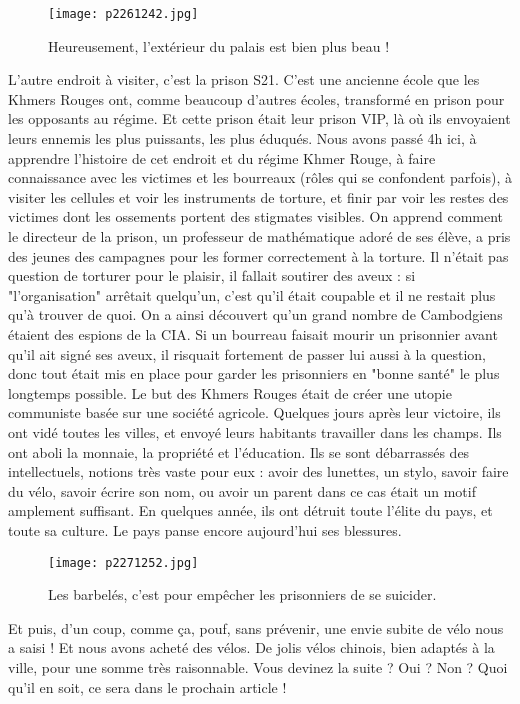 \documentclass{book}
\begin{document}
\begin{figure}[h]
\centering
\texttt{[image: p2261242.jpg]}
\caption*{Heureusement, l'extérieur du palais est bien plus beau !}
\end{figure}

L'autre endroit à visiter, c'est la prison S21. C'est une ancienne école que les Khmers Rouges ont, comme beaucoup d'autres écoles, transformé en prison pour les opposants au régime. Et cette prison était leur prison VIP, là où ils envoyaient leurs ennemis les plus puissants, les plus éduqués. Nous avons passé 4h ici, à apprendre l'histoire de cet endroit et du régime Khmer Rouge, à faire connaissance avec les victimes et les bourreaux (rôles qui se confondent parfois), à visiter les cellules et voir les instruments de torture, et finir par voir les restes des victimes dont les ossements portent des stigmates visibles. On apprend comment le directeur de la prison, un professeur de mathématique adoré de ses élève, a pris des jeunes des campagnes pour les former correctement à la torture. Il n'était pas question de torturer pour le plaisir, il fallait soutirer des aveux : si "l'organisation" arrêtait quelqu'un, c'est qu'il était coupable et il ne restait plus qu'à trouver de quoi. On a ainsi découvert qu'un grand nombre de Cambodgiens étaient des espions de la CIA. Si un bourreau faisait mourir un prisonnier avant qu'il ait signé ses aveux, il risquait fortement de passer lui aussi à la question, donc tout était mis en place pour garder les prisonniers en "bonne santé" le plus longtemps possible. Le but des Khmers Rouges était de créer une utopie communiste basée sur une société agricole. Quelques jours après leur victoire, ils ont vidé toutes les villes, et envoyé leurs habitants travailler dans les champs. Ils ont aboli la monnaie, la propriété et l'éducation. Ils se sont débarrassés des intellectuels, notions très vaste pour eux : avoir des lunettes, un stylo, savoir faire du vélo, savoir écrire son nom, ou avoir un parent dans ce cas était un motif amplement suffisant. En quelques année, ils ont détruit toute l'élite du pays, et toute sa culture. Le pays panse encore aujourd'hui ses blessures.


\begin{figure}[h]
\centering
\texttt{[image: p2271252.jpg]}
\caption*{Les barbelés, c'est pour empêcher les prisonniers de se suicider.}
\end{figure}

Et puis, d'un coup, comme ça, pouf, sans prévenir, une envie subite de vélo nous a saisi ! Et nous avons acheté des vélos. De jolis vélos chinois, bien adaptés à la ville, pour une somme très raisonnable. Vous devinez la suite ? Oui ? Non ? Quoi qu'il en soit, ce sera dans le prochain article !
\end{document}

